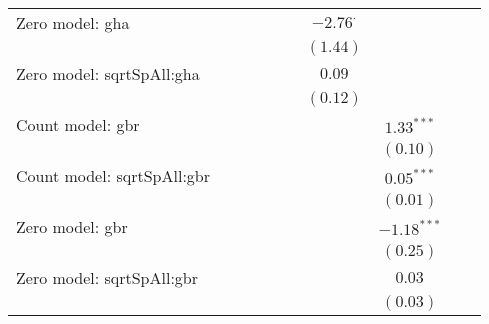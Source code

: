 \begin{center}
\begin{longtable}{l c c c c c c c c c}
Zero model: gha                &                &                &                &                 &                & $-2.76^{\cdot}$ &                 &                 &                \\
                               &                &                &                &                 &                & $(1.44)$        &                 &                 &                \\
Zero model: sqrtSpAll:gha      &                &                &                &                 &                & $0.09$          &                 &                 &                \\
                               &                &                &                &                 &                & $(0.12)$        &                 &                 &                \\
Count model: gbr               &                &                &                &                 &                &                 & $1.33^{***}$    &                 &                \\
                               &                &                &                &                 &                &                 & $(0.10)$        &                 &                \\
Count model: sqrtSpAll:gbr     &                &                &                &                 &                &                 & $0.05^{***}$    &                 &                \\
                               &                &                &                &                 &                &                 & $(0.01)$        &                 &                \\
Zero model: gbr                &                &                &                &                 &                &                 & $-1.18^{***}$   &                 &                \\
                               &                &                &                &                 &                &                 & $(0.25)$        &                 &                \\
Zero model: sqrtSpAll:gbr      &                &                &                &                 &                &                 & $0.03$          &                 &                \\
                               &                &                &                &                 &                &                 & $(0.03)$        &                 &                \\

\end{longtable}
\end{center}
